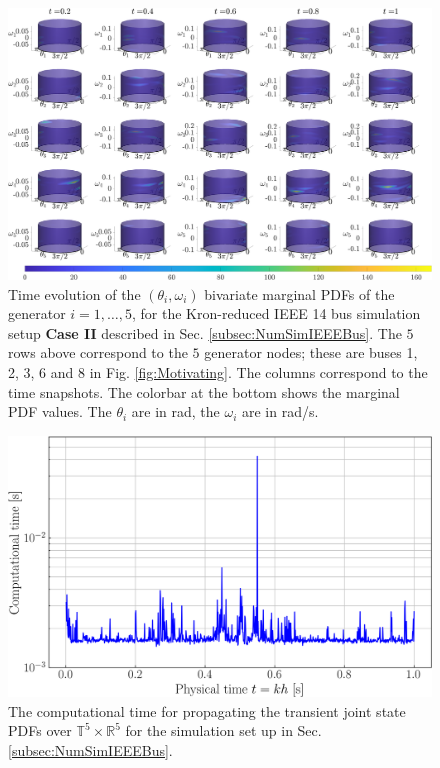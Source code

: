 \documentclass[10pt,twocolumn]{IEEEtran}
\begin{document}
\begin{figure}[t]
\centering
\includegraphics[width=0.9\linewidth]{IEEE14marginalsCase1.png}
\caption{\small{Time evolution of the $(\theta_{i},\omega_{i})$ bivariate marginal PDFs of the generator $i=1,\hdots,5$, for the Kron-reduced IEEE 14 bus simulation setup \textbf{Case II} described in Sec. \ref{subsec:NumSimIEEEBus}. The $5$ rows above correspond to the $5$ generator nodes; these are buses 1, 2, 3, 6 and 8 in Fig. \ref{fig:Motivating}. The columns correspond to the time snapshots. The colorbar at the bottom shows the marginal PDF values. The $\theta_i$ are in rad, the $\omega_i$ are in rad/s.}}
\vspace*{-0.1in}
\label{fig:IEEE14marginalsCase1}
\end{figure}



\begin{figure}[t]
\centering
\includegraphics[width=0.95\linewidth]{ComputationalTimeSyntheticIEEE14bus.png}
\caption{\small{The computational time for propagating the transient joint state PDFs over $\mathbb{T}^{5}\times\mathbb{R}^{5}$ for the simulation set up in Sec. \ref{subsec:NumSimIEEEBus}.}}
\vspace*{-0.1in}
\label{fig:CompTimeIEEE14bus}
\end{figure}
\end{document}

